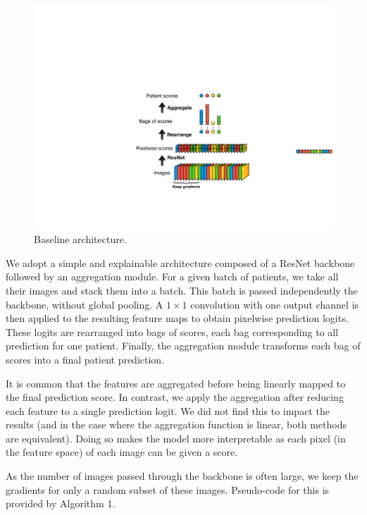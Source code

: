 \documentclass[final]{cvpr}
\begin{document}
	\begin{figure}[t]
		\begin{center}
			\includegraphics[width=0.9\linewidth]{fig/graphic2.pdf}
		\end{center}
		\caption{Baseline architecture.}
		\label{fig:overview}
	\end{figure}

	We adopt a simple and explainable architecture composed of a ResNet \cite{resnet} backbone followed by an aggregation module.
	For a given batch of patients, we take all their images and stack them into a batch.
	This batch is passed independently the backbone, without global pooling. 
	A $1\times 1$ convolution with one output channel is then applied to the resulting feature maps to obtain pixelwise prediction logits.
	These logits are rearranged into bags of scores, each bag corresponding to all  prediction for one patient.
	Finally, the aggregation module transforms each bag of scores into a final patient prediction.
	
	It is common that the features are aggregated before being linearly mapped to the final prediction score.
	In contrast, we apply the aggregation after reducing each feature to a single prediction logit. We did not find this to impact the results (and in the case where the aggregation function is linear, both methods are equivalent). Doing so makes the model more interpretable as each pixel (in the feature space) of each image can be given a score. 
	

	As the number of images passed through the backbone is often large, we keep the gradients for only a random subset of these images. Pseudo-code for this is provided by Algorithm 1.
\end{document}
